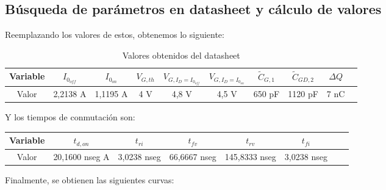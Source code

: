 \documentclass[e4_tp1_main.tex]{subfiles}
\begin{document}
\subsection{Búsqueda de parámetros en datasheet y cálculo de valores}

Reemplazando los valores de estos, obtenemos lo siguiente:\\
\begin{table}[H]
\centering
\begin{tabular}{|c|c|c|c|c|c|c|c|c|c|}
\hline
Variable & $I_{0_{off}}$ & $I_{0_{on}}$ & $V_{G,th}$ & $V_{G,I_D=I_{0_{off}}}$   & $V_{G,I_D=I_{0_{on}}}$ & $\tilde{C}_{G,1}$ & $\tilde{C}_{GD,2}$ & $\Delta Q$  \\
\hline
Valor & 2,2138 A & 1,1195 A & 4 V & 4,8 V & 4,5 V & 650 pF & 1120 pF & 7 nC\\
\hline
\end{tabular}
\caption{Valores obtenidos del datasheet}
\end{table}

Y los tiempos de conmutación son:\\
\begin{tabular}{|c|c|c|c|c|c|c|c|}
\hline
Variable & $t_{d,on}$ & $t_{ri}$ & $t_{fv}$ & $t_{rv}$ & $t_{fi}$  \\
\hline
Valor & 20,1600 nseg A & 3,0238 nseg & 66,6667 nseg & 145,8333 nseg & 3,0238 nseg\\
\hline
\end{tabular}

Finalmente, se obtienen las siguientes curvas:
\end{document}
